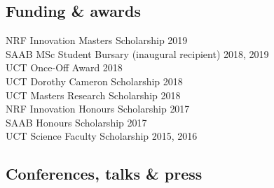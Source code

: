 \documentclass[10pt]{article}
\begin{document}
\begin{multicols}{2} %

\subsection*{Funding \& awards} %

NRF Innovation Masters Scholarship                       \hfill {\small 2019} \\
SAAB MSc Student Bursary {\small (inaugural recipient)}
                                                   \hfill {\small 2018, 2019} \\
UCT Once-Off Award                                 \hfill {\small       2018} \\
UCT Dorothy Cameron Scholarship                    \hfill {\small       2018} \\
UCT Masters Research Scholarship                   \hfill {\small       2018} \\
NRF Innovation Honours Scholarship                 \hfill {\small       2017} \\
SAAB Honours Scholarship                           \hfill {\small       2017} \\
UCT Science Faculty Scholarship                    \hfill {\small 2015, 2016} \\

\subsection*{Conferences, talks \& press} %


\end{multicols}
\end{document}
